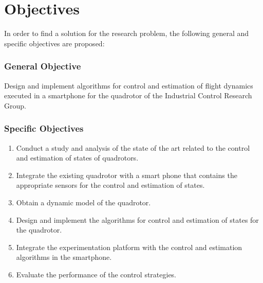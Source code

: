 \section{Objectives}
In order to find a solution for the research problem, the following general and specific objectives are proposed:
\subsubsection{General Objective}
Design and implement algorithms for control and estimation of flight dynamics executed in a smartphone for the quadrotor of the Industrial Control Research Group.
\subsubsection{Specific Objectives}
\begin{enumerate}
\item Conduct a study and analysis of the state of the art related to the control and estimation of states of quadrotors.
\item Integrate the existing quadrotor with a smart phone that contains the appropriate sensors for the control and estimation of states.
\item Obtain a dynamic model of the quadrotor.
\item Design and implement the algorithms for control and estimation of states for the quadrotor.
\item Integrate the experimentation platform with the control and estimation algorithms in the smartphone.
\item Evaluate the performance of the control strategies.%
\end{enumerate}


